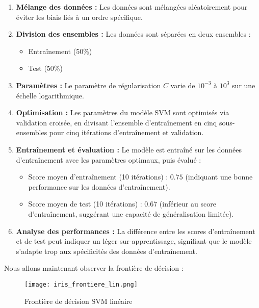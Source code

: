 \documentclass{article}
\begin{document}
\begin{enumerate}
    \item \textbf{Mélange des données :} Les données sont mélangées aléatoirement pour éviter les biais liés à un ordre spécifique.
    
    \item \textbf{Division des ensembles :} Les données sont séparées en deux ensembles : 
    \begin{itemize}
        \item Entraînement (50\%)
        \item Test (50\%)
    \end{itemize}
    
    \item \textbf{Paramètres :} Le paramètre de régularisation $C$ varie de $10^{-3}$ à $10^{3}$ sur une échelle logarithmique.
    
    \item \textbf{Optimisation :} Les paramètres du modèle SVM sont optimisés via validation croisée, en divisant l'ensemble d'entraînement en cinq sous-ensembles pour cinq itérations d'entraînement et validation.
    
    \item \textbf{Entraînement et évaluation :} Le modèle est entraîné sur les données d'entraînement avec les paramètres optimaux, puis évalué :
    \begin{itemize}
        \item Score moyen d'entraînement (10 itérations) : $0.75$ (indiquant une bonne performance sur les données d'entraînement).
        \item Score moyen de test (10 itérations) : $0.67$ (inférieur au score d'entraînement, suggérant une capacité de généralisation limitée).
    \end{itemize}
    
    \item \textbf{Analyse des performances :} La différence entre les scores d'entraînement et de test peut indiquer un léger sur-apprentissage, signifiant que le modèle s'adapte trop aux spécificités des données d'entraînement.
\end{enumerate}

\pagebreak


Nous allons maintenant observer la frontière de décision :


\begin{figure}[H]
    \centering
    \texttt{[image: iris\_frontiere\_lin.png]}
    \caption{Frontière de décision SVM linéaire}
    \label{fig:enter-label}
\end{figure}
\end{document}
